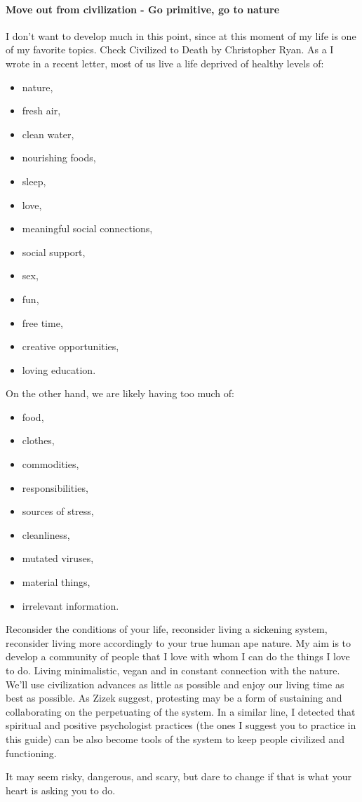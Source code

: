 \documentclass{article}
\begin{document}
\paragraph{Move out from civilization - Go primitive, go to nature}
I don’t want to develop much in this point, since at this moment of my life is one of my favorite topics. Check Civilized to Death by Christopher Ryan. As a I wrote in a recent letter, most of us live a life deprived of healthy levels of:
\begin{itemize}
    \item nature,
    \item fresh air,
    \item clean water,
    \item nourishing foods,
    \item sleep,
    \item love,
    \item meaningful social connections,
    \item social support,
    \item sex,
    \item fun,
    \item free time,
    \item creative opportunities,
    \item loving education.
\end{itemize}
On the other hand, we are likely having too much of:
\begin{itemize}
    \item food,
    \item clothes,
    \item commodities,
    \item responsibilities,
    \item sources of stress,
    \item cleanliness,
    \item mutated viruses,
    \item material things,
    \item irrelevant information.
\end{itemize}

Reconsider the conditions of your life, reconsider living a sickening system, reconsider living more accordingly to your true human ape nature. My aim is to develop a community of people that I love with whom I can do the things I love to do. Living minimalistic, vegan and in constant connection with the nature. We’ll use civilization advances as little as possible and enjoy our living time as best as possible. As Zizek suggest, protesting may be a form of sustaining and collaborating on the perpetuating of the system. In a similar line, I detected that spiritual and positive psychologist practices (the ones I suggest you to practice in this guide) can be also become tools of the system to keep people civilized and functioning.

It may seem risky, dangerous, and scary, but dare to change if that is what your heart is asking you to do. 



\end{document}
